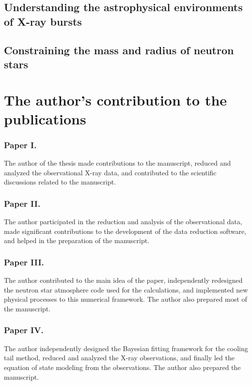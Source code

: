 \subsection{Understanding the astrophysical environments of X-ray bursts}


\subsection{Constraining the mass and radius of neutron stars}





\section{The author's contribution to the publications} 

\subsubsection*{Paper I.}
The author of the thesis made contributions to the manuscript, reduced and analyzed the observational X-ray data, and contributed to the scientific discussions related to the manuscript.


\subsubsection*{Paper II.}
The author participated in the reduction and analysis of the observational data, made significant contributions to the development of the data reduction software, and helped in the preparation of the manuscript.


\subsubsection*{Paper III.}
The author contributed to the main idea of the paper, independently redesigned the neutron star atmosphere code used for the calculations, and implemented new physical processes to this numerical framework. 
The author also prepared most of the manuscript.


\subsubsection*{Paper IV.}
The author independently designed the Bayesian fitting framework for the cooling tail method, reduced and analyzed the X-ray observations, and finally led the equation of state modeling from the observations. 
The author also prepared the manuscript.


